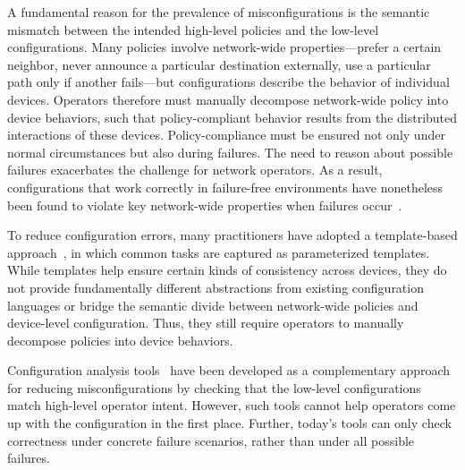\documentclass[10pt]{sigalternate052015} %
\providecommand{\DIFadd}[1]{{\protect\color{blue}\uwave{#1}}} %
\providecommand{\DIFaddbegin}{} %
\providecommand{\DIFaddend}{} %
\begin{document}

A fundamental reason for the prevalence of misconfigurations is the
semantic mismatch between the intended high-level
policies and the low-level configurations.
Many policies involve network-wide properties---prefer a certain neighbor,
never announce a particular destination externally,
use a particular path only if another fails---but configurations describe the behavior of
individual devices.
%
Operators therefore must manually decompose network-wide policy into
device behaviors, such that policy-compliant behavior results from the distributed interactions of
these devices.
%
Policy-compliance must be ensured not only under normal
circumstances but also during failures.  The need to reason
about possible failures exacerbates the challenge
for network operators.  As a result, configurations that work
correctly in failure-free environments have nonetheless been found to violate key
network-wide properties when failures occur~\cite{batfish}.

To reduce configuration errors, many practitioners have \DIFaddbegin \DIFadd{a }\DIFaddend adopted a template-based
approach~\cite{hatch,thwack}, in which common tasks are captured as parameterized templates.
%
%
While templates help ensure certain kinds of consistency across devices,
they do not provide fundamentally different abstractions from existing configuration languages
or bridge the semantic divide between network-wide policies and device-level configuration.
Thus, they still require operators to
manually decompose policies into device behaviors.

Configuration analysis tools~\cite{batfish,feamster+:rcc} have been developed as a complementary approach for reducing misconfigurations by checking that the low-level configurations match high-level operator intent. However, such tools cannot help operators come up with the configuration in the first place. Further, today's tools can only check correctness under concrete failure scenarios, rather than under all possible failures.
\end{document}
